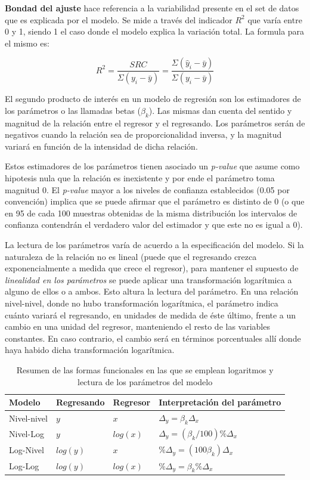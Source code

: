 \textbf{Bondad del ajuste} hace referencia a la variabilidad presente en el set de datos que es explicada por el modelo. Se mide a través del indicador $R^2$ que varía entre 0 y 1, siendo 1 el caso donde el modelo explica la variación total. La formula para el mismo es:

$$R^2 = \frac{SRC}{\Sigma(y_i - \bar{y})} = \frac{\Sigma(\hat{y}_i - \bar{y})}{\Sigma(y_i - \bar{y})} $$

El segundo producto de interés en un modelo de regresión son los estimadores de los parámetros o las llamadas betas ($\beta_k$). Las mismas dan cuenta del sentido y magnitud de la relación entre el regresor y el regresando. Los parámetros serán de negativos cuando la relación sea de proporcionalidad inversa, y la magnitud variará en función de la intensidad de dicha relación. 

Estos estimadores de los parámetros tienen asociado un \textit{p-value} que asume como hipotesis nula que la relación es inexistente y por ende el parámetro toma magnitud 0. El \textit{p-value} mayor a los niveles de confianza establecidos (0.05 por convención) implica que se puede afirmar que el parámetro es distinto de 0  (o que en 95 de cada 100 muestras obtenidas de la misma distribución los intervalos de confianza contendrán el verdadero valor del estimador y que este no es igual a 0).

La lectura de los parámetros varía de acuerdo a la especificación del modelo. Si la naturaleza de la relación no es lineal (puede que el regresando crezca exponencialmente a medida que crece el regresor), para mantener el supuesto de \textit{linealidad en los parámetros} se puede aplicar una transformación logarítmica a alguno de ellos o a ambos. Esto altura la lectura del parámetro. En una relación nivel-nivel, donde no hubo transformación logarítmica, el parámetro indica cuánto variará el regresando, en unidades de medida de éste último, frente a un cambio en una unidad del regresor, manteniendo el resto de las variables constantes. En caso contrario, el cambio será en términos porcentuales allí donde haya habido dicha transformación logarítmica.  

\begin{table}[h!]
	\centering
	\caption{Resumen de las formas funcionales en las que se emplean logaritmos y lectura de los parámetros del modelo}
	\label{tab:table3}
	\begin{tabular}{l|l|l|l}
		Modelo & Regresando & Regresor & Interpretación del parámetro\\
		\hline
		Nivel-nivel & $y$ & $x$ & $\Delta_y = \beta_k \Delta_x$\\
		\hline
		Nivel-Log & $y$ & $log(x)$ & $\Delta_y = (\beta_k / 100)\% \Delta_x$\\
		\hline
		Log-Nivel & $log(y)$ & $x$ & $ \% \Delta_y = (100 \beta_k) \Delta_x$\\
		\hline
		Log-Log & $log(y)$ & $log(x)$ & $ \% \Delta_y = \beta_k \% \Delta_x$\\
				
	\end{tabular}
\end{table}



